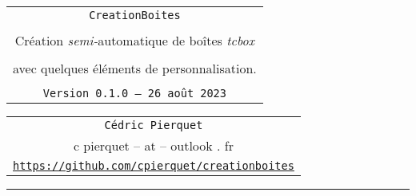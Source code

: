 \documentclass[french,11pt,a4paper]{article}
\def\TPversion{0.1.0}
\def\TPdate{26 août 2023}
\begin{document}
\pagestyle{fancy}

\thispagestyle{empty}

\begin{center}
	\begin{minipage}{0.88\linewidth}
	\begin{tcolorbox}[colframe=yellow,colback=yellow!15]
		\begin{center}
			\begin{tabular}{c}
				{\Huge \texttt{CreationBoites}}\\
				\\
				{\LARGE Création \textit{semi-}automatique de boîtes \textit{tcbox}} \\
				\\
				{\LARGE avec quelques éléments de personnalisation.} \\
				\\
				{\small \texttt{Version \TPversion{} -- \TPdate}}
		\end{tabular}
		\end{center}
	\end{tcolorbox}
\end{minipage}
\end{center}

\begin{center}
	\begin{tabular}{c}
	\texttt{Cédric Pierquet}\\
	{\ttfamily c pierquet -- at -- outlook . fr}\\
	\texttt{\url{https://github.com/cpierquet/creationboites}}
\end{tabular}
\end{center}

\hrule

\vfill
\end{document}
